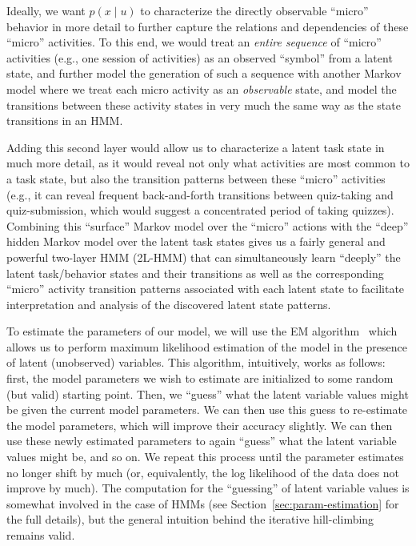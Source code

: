 Ideally, we want $p(x \mid u)$ to characterize the directly observable
``micro'' behavior in more detail to further capture the relations and
dependencies of these ``micro'' activities. To this end, we would treat an
\emph{entire sequence} of ``micro'' activities (e.g., one session of
activities) as an observed ``symbol'' from a latent state, and further
model the generation of such a sequence with another Markov model where we
treat each micro activity as an \emph{observable} state, and model the
transitions between these activity states in very much the same way as the
state transitions in an HMM.

Adding this second layer would allow us to characterize a latent task
state in much more detail, as it would reveal not only what activities are
most common to a task state, but also the transition patterns between these
``micro'' activities (e.g., it can reveal frequent back-and-forth
transitions between quiz-taking and quiz-submission, which would suggest a
concentrated period of taking quizzes). Combining this ``surface'' Markov
model over the ``micro'' actions with the ``deep'' hidden Markov model over
the latent task states gives us a fairly general and powerful two-layer HMM
(2L-HMM) that can simultaneously learn ``deeply'' the latent task/behavior
states and their transitions as well as the corresponding ``micro''
activity transition patterns associated with each latent state to
facilitate interpretation and analysis of the discovered latent state
patterns.

To estimate the parameters of our model, we will use the EM
algorithm~\citep{Dempster:1977:JRSS} which allows us to perform maximum
likelihood estimation of the model in the presence of latent (unobserved)
variables. This algorithm, intuitively, works as follows: first, the model
parameters we wish to estimate are initialized to some random (but valid)
starting point. Then, we ``guess'' what the latent variable values might
be given the current model parameters. We can then use this guess to
re-estimate the model parameters, which will improve their accuracy
slightly. We can then use these newly estimated parameters to again
``guess'' what the latent variable values might be, and so on. We repeat
this process until the parameter estimates no longer shift by much (or,
equivalently, the log likelihood of the data does not improve by much). The
computation for the ``guessing'' of latent variable values is somewhat
involved in the case of HMMs (see Section~\ref{sec:param-estimation} for
the full details), but the general intuition behind the iterative
hill-climbing remains valid.

